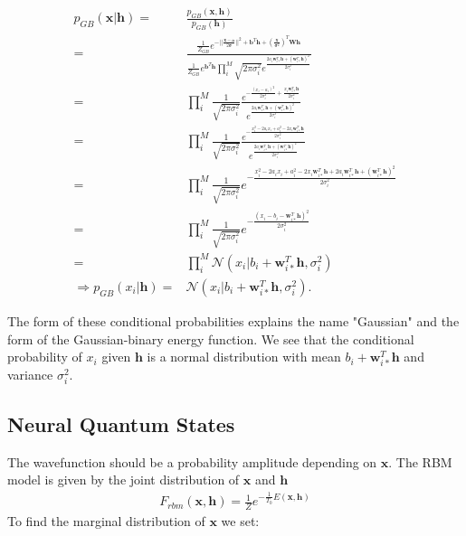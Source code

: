 \documentclass[%
oneside,                 %
final,                   %
10pt]{article}
\begin{document}
\begin{align}
	p_{GB} (\bm{x}|\bm{h})
	=& \frac{p_{GB} (\bm{x}, \bm{h})}{p_{GB} (\bm{h})} \nonumber \\
	=& \frac{\frac{1}{Z_{GB}} e^{-\vert\vert\frac{\bm{x} -\bm{a}}{2\bm{\sigma}}\vert\vert^2 + \bm{b}^T \bm{h} 
	+ (\frac{\bm{x}}{\bm{\sigma}^2})^T \bm{W}\bm{h}}}
	{\frac{1}{Z_{GB}} e^{\bm{b}^T \bm{h}} \prod_i^M
	\sqrt{2\pi \sigma_i^2}
	e^{\frac{2a_i \bm{w}_{i\ast}^T \bm{h} +(\bm{w}_{i\ast}^T \bm{h})^2 }{2\sigma_i^2}}}
	\nonumber \\
	=& \prod_i^M \frac{1}{\sqrt{2\pi \sigma_i^2}}
	\frac{e^{- \frac{(x_i - a_i)^2}{2\sigma_i^2} + \frac{x_i \bm{w}_{i\ast}^T \bm{h}}{2\sigma_i^2} }}
	{e^{\frac{2a_i \bm{w}_{i\ast}^T \bm{h} +(\bm{w}_{i\ast}^T \bm{h})^2 }{2\sigma_i^2}}}
	\nonumber \\
	=& \prod_i^M \frac{1}{\sqrt{2\pi \sigma_i^2}}
	\frac{e^{-\frac{x_i^2 - 2a_i x_i + a_i^2 - 2x_i \bm{w}_{i\ast}^T\bm{h} }{2\sigma_i^2} } }
	{e^{\frac{2a_i \bm{w}_{i\ast}^T \bm{h} +(\bm{w}_{i\ast}^T \bm{h})^2 }{2\sigma_i^2}}}
	\nonumber \\
	=& \prod_i^M \frac{1}{\sqrt{2\pi \sigma_i^2}}
	e^{- \frac{x_i^2 - 2a_i x_i + a_i^2 - 2x_i \bm{w}_{i\ast}^T\bm{h}
	+ 2a_i \bm{w}_{i\ast}^T \bm{h} +(\bm{w}_{i\ast}^T \bm{h})^2}
	{2\sigma_i^2} }
	\nonumber \\
	=& \prod_i^M \frac{1}{\sqrt{2\pi \sigma_i^2}}
	e^{ - \frac{(x_i - b_i - \bm{w}_{i\ast}^T \bm{h})^2}{2\sigma_i^2}} \nonumber \\
	=& \prod_i^M \mathcal{N}
	(x_i | b_i + \bm{w}_{i\ast}^T \bm{h}, \sigma_i^2) \\
	\Rightarrow p_{GB} (x_i|\bm{h}) =& \mathcal{N}
	(x_i | b_i + \bm{w}_{i\ast}^T \bm{h}, \sigma_i^2) .
\end{align}


The form of these conditional probabilities explains the name
"Gaussian" and the form of the Gaussian-binary energy function. We see
that the conditional probability of $x_i$ given $\bm{h}$ is a normal
distribution with mean $b_i + \bm{w}_{i\ast}^T \bm{h}$ and variance
$\sigma_i^2$.


\subsection{Neural Quantum States}


The wavefunction should be a probability amplitude depending on $\bm{x}$. The RBM model is given by the joint distribution of $\bm{x}$ and $\bm{h}$
\begin{align}
	F_{rbm}(\bm{x},\mathbf{h}) = \frac{1}{Z} e^{-\frac{1}{T_0}E(\bm{x},\mathbf{h})}
\end{align}
To find the marginal distribution of $\bm{x}$ we set:
\end{document}
